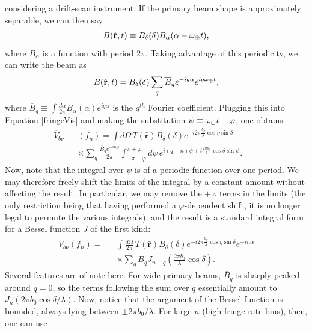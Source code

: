 \documentclass[twocolumn,apj,numberedappendix]{emulateapj}
\newcommand{\rhat}{\hat{\mathbf{r}}}
\begin{document}
considering a drift-scan instrument.  If the primary beam shape is
approximately separable, we can then say
\begin{equation}
\label{eq:SepBeam}
B(\rhat, t) \equiv B_\delta (\delta) B_\alpha (\alpha - \omega_\Earth t),
\end{equation}
where $B_\alpha$ is a function with period $2\pi$.  Taking advantage of this periodicity, we can write the beam as
\begin{equation}
B(\rhat, t) = B_\delta (\delta) \sum_q \overline{B}_q e^{-iq \alpha} e^{i q \omega_\Earth t},
\end{equation}
where $\overline{B}_q \equiv \int \frac{d\alpha}{2\pi} B_\alpha(\alpha)
e^{i q\alpha}$ is the $q^{th}$ Fourier coefficient.  Plugging this into
Equation \eqref{fringeVis} and making the substitution $\psi \equiv
\omega_\oplus t - \varphi$, one obtains
\begin{eqnarray}
\overline{V}_{b\nu} && (f_n)= \int d\Omega \, T(\rhat) B_\delta (\delta) e^{-i 2 \pi  \frac{b_y}{\lambda} \cos \eta \sin \delta} \nonumber \\
&& \times \sum_q \frac{\overline{B}_q e^{-i n \varphi}}{2 \pi} \int_{-\pi -\varphi}^{\pi+\varphi} d\psi \, e^{i (q-n) \psi +i \frac{2 \pi b_0}{\lambda} \cos \delta \sin \psi}. \qquad
\end{eqnarray}
Now, note that the integral over $\psi$ is of a periodic function over one
period.  We may therefore freely shift the limits of the integral by a constant
amount without affecting the result.  In particular, we may remove the
$+\varphi$ terms in the limits (the only restriction being that having performed a $\varphi$-dependent shift, it is no longer legal to permute the various integrals), and
the result is a standard integral form for a Bessel function $J$ of the first
kind:
\begin{eqnarray}
\label{fringeBessel}
\overline{V}_{b\nu} (f_n) =&& \int \frac{d\Omega}{2 \pi}\, T(\rhat) B_\delta (\delta) e^{-i 2 \pi  \frac{b_y}{\lambda} \cos \eta \sin \delta}
e^{-i n \alpha} \nonumber \\ 
&& \times \sum_q \overline{B}_q  J_{n-q} \left( \frac{2 \pi b_0}{\lambda} \cos \delta \right).
\end{eqnarray}
Several features are of note here.  For wide primary beams, $\overline{B}_q$
is sharply peaked around $q=0$, so the terms following the sum over $q$
essentially amount to $J_n ( 2 \pi b_0 \cos \delta / \lambda )$.  Now, notice
that the argument of the Bessel function is bounded, always lying between $\pm
2\pi b_0/ \lambda$.  For large $n$ (high fringe-rate bins), then, one can use
\end{document}
